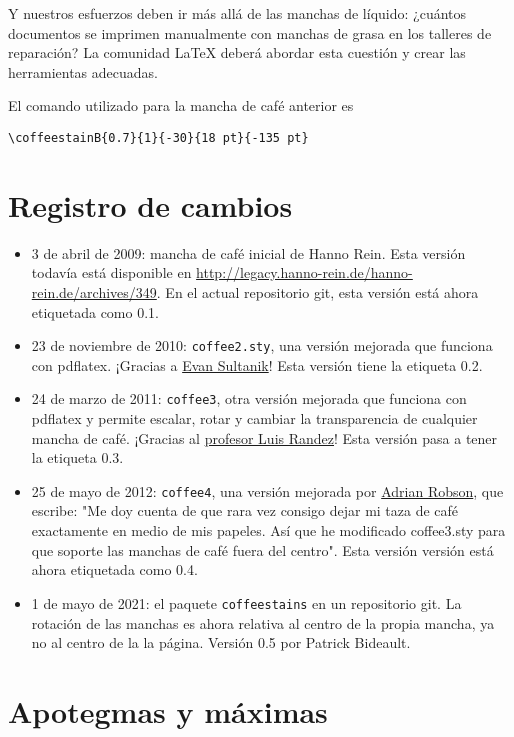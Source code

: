 \documentclass[a4paper, 11pt, BCOR = 0 pt, oneside]{scrartcl}
\begin{document}
Y nuestros esfuerzos deben ir más allá de las manchas de líquido: ¿cuántos
documentos se imprimen manualmente con manchas de grasa en los talleres de
reparación? La comunidad \LaTeX{} deberá abordar esta cuestión y crear las
herramientas adecuadas.

\vfill{}

\begin{tcolorbox}
El comando utilizado para la mancha de café anterior es

  \verb|\coffeestainB{0.7}{1}{-30}{18 pt}{-135 pt}|
\end{tcolorbox}
\newpage{}
\section{Registro de cambios}
\begin{itemize}
\item 3 de abril de 2009: mancha de café inicial de Hanno Rein. Esta versión
  todavía está disponible en
  \url{http://legacy.hanno-rein.de/hanno-rein.de/archives/349}. En el actual
  repositorio git, esta versión está ahora etiquetada como 0.1.
\item 23 de noviembre de 2010: \texttt{coffee2.sty}, una versión mejorada que
  funciona con pdflatex.  ¡Gracias a \href{http://www.sultanik.com/}{Evan
    Sultanik}! Esta versión tiene la etiqueta 0.2.
\item 24 de marzo de 2011: \texttt{coffee3}, otra versión mejorada que funciona con pdflatex
y permite escalar, rotar y cambiar la transparencia de cualquier mancha de café.
¡Gracias al \href{http://pcmap.unizar.es/~pilar/}{profesor Luis
    Randez}! Esta versión pasa a tener la etiqueta 0.3.
\item 25 de mayo de 2012: \texttt{coffee4}, una versión mejorada por
  \href{http://nepsweb.co.uk/homeapr/}{Adrian Robson}, que escribe: "Me doy
  cuenta de que rara vez consigo dejar mi taza de café exactamente en medio de
  mis papeles. Así que he modificado coffee3.sty para que soporte las manchas de
  café fuera del centro". Esta versión versión está ahora etiquetada como 0.4.
\item 1 de mayo de 2021: el paquete \texttt{coffeestains} en un repositorio
  git. La rotación de las manchas es ahora relativa al centro de la propia
  mancha, ya no al centro de la la página. Versión 0.5 por Patrick Bideault.
\end{itemize}
\label{stainC}

\section{Apotegmas y máximas}
\end{document}
